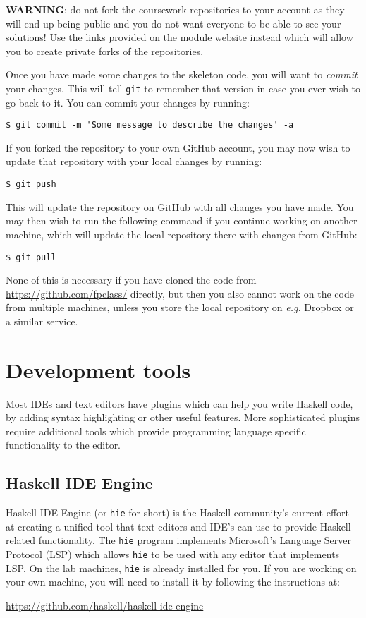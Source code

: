 \textbf{WARNING}: do not fork the coursework repositories to your account as they will end up being public and you do not want everyone to be able to see your solutions! Use the links provided on the module website instead which will allow you to create private forks of the repositories.

Once you have made some changes to the skeleton code, you will want to \emph{commit} your changes. This will tell \texttt{\small git} to remember that version in case you ever wish to go back to it. You can commit your changes by running:
\begin{verbatim}
$ git commit -m 'Some message to describe the changes' -a
\end{verbatim}
If you forked the repository to your own GitHub account, you may now wish to update that repository with your local changes by running:
\begin{verbatim}
$ git push
\end{verbatim}
This will update the repository on GitHub with all changes you have made. You may then wish to run the following command if you continue working on another machine, which will update the local repository there with changes from GitHub:
\begin{verbatim}
$ git pull
\end{verbatim}
None of this is necessary if you have cloned the code from {\small \url{https://github.com/fpclass/}} directly, but then you also cannot work on the code from multiple machines, unless you store the local repository on \emph{e.g.} Dropbox or a similar service. 

\section{Development tools}
\label{sec:dev-tools}

Most IDEs and text editors have plugins which can help you write Haskell code, by adding syntax highlighting or other useful features. More sophisticated plugins require additional tools which provide programming language specific functionality to the editor. 

\subsection{Haskell IDE Engine}

Haskell IDE Engine (or \texttt{\small hie} for short) is the Haskell community's current effort at creating a unified tool that text editors and IDE's can use to provide Haskell-related functionality. The \texttt{\small hie} program implements Microsoft's Language Server Protocol (LSP) which allows \texttt{\small hie} to be used with any editor that implements LSP. On the lab machines, \texttt{\small hie} is already installed for you. If you are working on your own machine, you will need to install it by following the instructions at:
\begin{center}
	\url{https://github.com/haskell/haskell-ide-engine}
\end{center}

